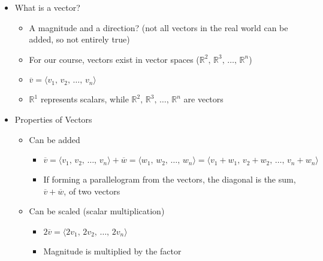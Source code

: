 \begin{itemize}

  \item What is a vector?

    \begin{itemize}

      \item A magnitude and a direction? (not all vectors in the real world can be added, so not entirely true)

      \item For our course, vectors exist in vector spaces ($\mathbb{R}^2,\,\mathbb{R}^3,\,\dots,\,\mathbb{R}^n$)

      \item $\overline{v}=\langle v_1,\,v_2,\,\dots,\,v_n \rangle$

      \item $\mathbb{R}^1$ represents scalars, while $\mathbb{R}^2,\,\mathbb{R}^3,\,\dots,\,\mathbb{R}^n$ are vectors

    \end{itemize}

  \item Properties of Vectors

    \begin{itemize}

      \item Can be added

        \begin{itemize}

          \item $\overline{v}=\langle v_1,\,v_2,\,\dots,\,v_n \rangle + \overline{w}=\langle w_1,\,w_2,\,\dots,\,w_n \rangle = \langle v_1+w_1,\,v_2+w_2,\,\dots,\,v_n+w_n \rangle$

          \item If forming a parallelogram from the vectors, the diagonal is the sum, $\overline{v}+\overline{w}$, of two vectors

        \end{itemize}

      \item Can be scaled (scalar multiplication)

        \begin{itemize}

          \item $2\overline{v}=\langle 2v_1,\,2v_2,\,\dots,\,2v_n \rangle$

          \item Magnitude is multiplied by the factor


\end{itemize}
\end{itemize}
\end{itemize}
